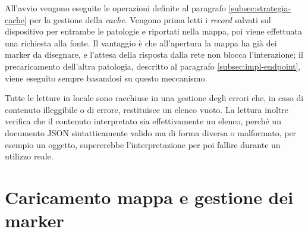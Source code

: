 
All'avvio vengono eseguite le operazioni definite al paragrafo \ref{subsec:strategia-cache} per la gestione della \textit{cache}.
Vengono prima letti i \textit{record} salvati sul dispositivo per entrambe le patologie e riportati nella mappa,
poi viene effettuata una richiesta alla fonte.
Il vantaggio è che all'apertura la mappa ha già dei marker da disegnare, e l'attesa della risposta dalla rete non blocca
l'interazione; il precaricamento dell'altra patologia, descritto al paragrafo \ref{subsec:impl-endpoint}, viene eseguito
sempre basandosi su questo meccanismo.


Tutte le letture in locale sono racchiuse in una gestione degli errori che, in caso di contenuto illeggibile o di errore, restituisce un elenco vuoto.
La lettura inoltre verifica che il contenuto interpretato sia effettivamente un elenco, perché un documento JSON sintatticamente
valido ma di forma diversa o malformato, per esempio un oggetto, supererebbe l'interpretazione per poi fallire durante un utilizzo reale.

\section{Caricamento mappa e gestione dei marker}\label{sec:impl-mappe}

